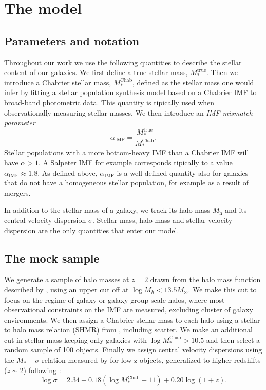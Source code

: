 \documentclass[usenatbib, letters]{mnras}
\def\mhalo{M_{\mathrm{h}}}
\def\mtrue{M_*^{\mathrm{true}}}
\def\mchab{M_*^{\mathrm{Chab}}}
\def\aimf{\alpha_{\mathrm{IMF}}}
\begin{document}
\section{The model}\label{sect:model}

\subsection{Parameters and notation}
Throughout our work we use the following quantities to describe the stellar content of our galaxies. We first define a true stellar mass, $\mtrue$. Then we introduce a Chabrier stellar mass, $\mchab$, defined as the stellar mass one would infer by fitting a stellar population synthesis model based on a Chabrier IMF to broad-band photometric data. This quantity is tipically used when observationally measuring stellar masses.
We then introduce an {\em IMF mismatch parameter}
\begin{equation}\label{eq:aimf}
\aimf = \frac{\mtrue}{\mchab}.
\end{equation}
Stellar populations with a more bottom-heavy IMF than a Chabrier IMF will have $\alpha>1$. A Salpeter IMF for example corresponds tipically to a value $\aimf\approx1.8$.
As defined above, $\aimf$ is a well-defined quantity also for galaxies that do not have a homogeneous stellar population, for example as a result of mergers.

In addition to the stellar mass of a galaxy, we track its halo mass $\mhalo$ and its central velocity dispersion $\sigma$.
Stellar mass, halo mass and stellar velocity dispersion are the only quantities that enter our model.


\subsection{The mock sample}

We generate a sample of halo masses at $z=2$ drawn from the halo mass function described by \citet{Tin++08}, using an upper cut off at $\log{M_h} < 13.5M_\odot$.
We make this cut to focus on the regime of galaxy or galaxy group scale halos, where most observational constraints on the IMF are measured, excluding cluster of galaxy environments.
We then assign a Chabrier stellar mass to each halo using a stellar to halo mass relation (SHMR) from \citet{Lea++12}, including scatter.
We make an additional cut in stellar mass keeping only galaxies with $\log{\mchab} > 10.5$ and then select a random sample of 100 objects.
Finally we assign central velocity dispersions using the $M_*-\sigma$ relation measured by \citet{Aug++10} for low-z objects, generalized to higher redshifts ($z \sim 2$) following \citet{Mas++15}:
\begin{equation}\label{eq:mason}
\log{\sigma} = 2.34 + 0.18(\log{\mchab} - 11) + 0.20\log{(1 + z)}.
\end{equation}
\end{document}
